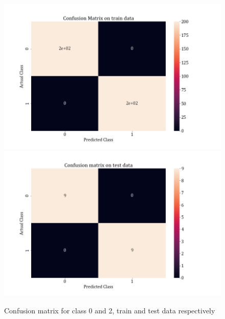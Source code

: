 \documentclass[11pt,a4paper]{article}
\begin{document}
\begin{figure}[H]
\centering
\includegraphics[scale=0.4]{images/1A_ovo_conf02_train.png}
\includegraphics[scale=0.4]{images/1A_ovo_conf02_test.png}
\caption{Confusion matrix for class 0 and 2, train and test data respectively}
\end{figure}
\end{document}

